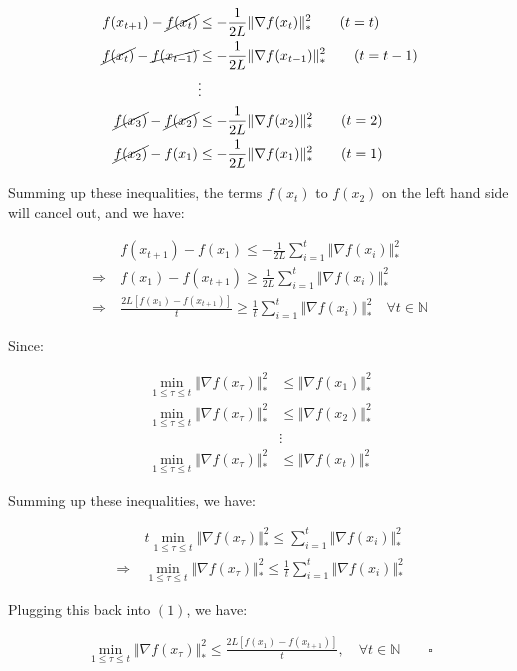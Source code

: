 \documentclass{article}
\begin{document}
\begin{align*}
    f ( x_{t + 1} ) - \cancel{f ( x_t )} &\leq -\frac{1}{2L} \Vert \nabla f ( x_t ) \Vert_*^2 \qquad (t = t) \\
    \cancel{f ( x_t )} - \cancel{f ( x_{t - 1} )} &\leq -\frac{1}{2L} \Vert \nabla f ( x_{t - 1} ) \Vert_*^2 \qquad (t = t - 1) \\
    &\vdots \\
    \cancel{f ( x_3 )} - \cancel{f ( x_2 )} &\leq -\frac{1}{2L} \Vert \nabla f ( x_2 ) \Vert_*^2 \qquad (t = 2) \\
    \cancel{f ( x_2 )} - f ( x_1 ) &\leq -\frac{1}{2L} \Vert \nabla f ( x_1 ) \Vert_*^2 \qquad (t = 1) 
\end{align*}

Summing up these inequalities, the terms $f(x_t)$ to $f(x_2)$ on the left hand side will cancel out, and we have:

\begin{align*}
    &f(x_{t+1}) - f(x_1) \leq -\frac{1}{2L} \sum_{i=1}^{t} \Vert \nabla f ( x_i ) \Vert_*^2 \\
    \Rightarrow \ &f(x_1) - f(x_{t+1}) \geq \frac{1}{2L} \sum_{i=1}^{t} \Vert \nabla f ( x_i ) \Vert_*^2 \\
    \Rightarrow \ &\frac{2L \left[ f(x_1) - f(x_{t+1}) \right]}{t} \geq \frac{1}{t} \sum_{i=1}^{t} \Vert \nabla f ( x_i ) \Vert_*^2 \quad \forall t \in \mathbb{N} \tag{1}
\end{align*}

Since:

\begin{align*}
    \min_{1 \leq \tau \leq t} \Vert \nabla f ( x_\tau ) \Vert_*^2 &\leq \Vert \nabla f(x_1) \Vert_*^2 \\
    \min_{1 \leq \tau \leq t} \Vert \nabla f ( x_\tau ) \Vert_*^2 &\leq \Vert \nabla f(x_2) \Vert_*^2 \\
    &\vdots \\
    \min_{1 \leq \tau \leq t} \Vert \nabla f ( x_\tau ) \Vert_*^2 &\leq \Vert \nabla f(x_t) \Vert_*^2
\end{align*}

Summing up these inequalities, we have:

\begin{align*}
    &t \min_{1 \leq \tau \leq t} \Vert \nabla f ( x_\tau ) \Vert_*^2 \leq \sum_{i=1}^{t} \Vert \nabla f ( x_i ) \Vert_*^2 \\
    \Rightarrow \ &\min_{1 \leq \tau \leq t} \Vert \nabla f ( x_\tau ) \Vert_*^2 \leq \frac{1}{t} \sum_{i=1}^{t} \Vert \nabla f ( x_i ) \Vert_*^2
\end{align*}

Plugging this back into $(1)$, we have:

\begin{align*}
    \min_{1 \leq \tau \leq t} \Vert \nabla f ( x_\tau ) \Vert_*^2 \leq \frac{ 2 L \left[ f ( x_1 ) - f ( x_{t + 1} ) \right] }{t} , \quad \forall t \in \mathbb{N} \qquad \square
\end{align*}
\end{document}
